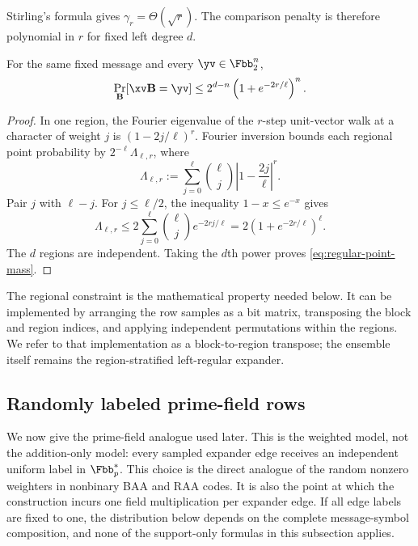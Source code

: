 Stirling's formula gives $\gamma_r=\Theta(\sqrt r)$.  The comparison penalty
is therefore polynomial in $r$ for fixed left degree $d$.

\begin{lemma}
\label{lem:regular-point-mass}
For the same fixed message and every $\yv\in\Fbb_2^n$,
\begin{equation}
 \Pr_{\B}[\xv\B=\yv]
 \leq2^{d-n}\left(1+e^{-2r/\ell}\right)^n.
 \label{eq:regular-point-mass}
\end{equation}
\end{lemma}

\begin{proof}
In one region, the Fourier eigenvalue of the $r$-step unit-vector walk at a
character of weight $j$ is $(1-2j/\ell)^r$.  Fourier inversion bounds each
regional point probability by $2^{-\ell}\Lambda_{\ell,r}$, where
\[
 \Lambda_{\ell,r}:=
 \sum_{j=0}^{\ell}\binom{\ell}{j}
       \left|1-\frac{2j}{\ell}\right|^r.
\]
Pair $j$ with $\ell-j$.  For $j\leq\ell/2$, the inequality
$1-x\leq e^{-x}$ gives
\[
 \Lambda_{\ell,r}
 \leq2\sum_{j=0}^{\ell}\binom{\ell}{j}e^{-2rj/\ell}
 =2(1+e^{-2r/\ell})^\ell.
\]
The $d$ regions are independent.  Taking the $d$th power proves
\eqref{eq:regular-point-mass}.
\end{proof}

The regional constraint is the mathematical property needed below.  It can be
implemented by arranging the row samples as a bit matrix, transposing the
block and region indices, and applying independent permutations within the
regions.  We refer to that implementation as a block-to-region transpose;
the ensemble itself remains the region-stratified left-regular expander.

\subsection{Randomly labeled prime-field rows}
\label{sec:prime-field-expander}

We now give the prime-field analogue used later.  This is the weighted model,
not the addition-only model: every sampled expander edge receives an
independent uniform label in $\Fbb_p^*$.  This choice is the direct analogue
of the random nonzero weighters in nonbinary BAA and RAA codes.  It is also the
point at which the construction incurs one field multiplication per expander
edge.  If all edge labels are fixed to one, the distribution below depends on
the complete message-symbol composition, and none of the support-only formulas
in this subsection applies.

